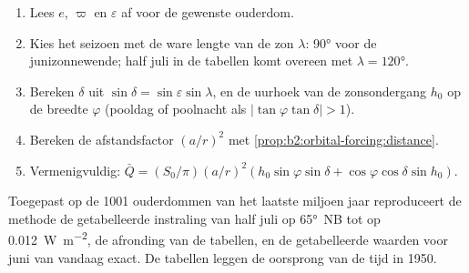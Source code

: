 \begin{method}\label{met:b2:orbital-forcing:curve}
\begin{enumerate}
  \item Lees $e$, $\varpi$ en $\varepsilon$ af voor de gewenste ouderdom.
  \item Kies het seizoen met de ware lengte van de zon $\lambda$: \ang{90} voor de junizonnewende;
        half juli in de tabellen komt overeen met $\lambda = \ang{120}$.
  \item Bereken $\delta$ uit $\sin\delta = \sin\varepsilon\sin\lambda$, en de uurhoek van de
        zonsondergang $h_0$ op de breedte $\varphi$ (pooldag of poolnacht als $|\tan\varphi\tan\delta| > 1$).
  \item Bereken de afstandsfactor $(a/r)^2$ met \cref{prop:b2:orbital-forcing:distance}.
  \item Vermenigvuldig: $\bar Q = (S_0/\pi)(a/r)^2(h_0\sin\varphi\sin\delta +
        \cos\varphi\cos\delta\sin h_0)$.
\end{enumerate}
\end{method}

Toegepast op de 1001 ouderdommen van het laatste miljoen jaar reproduceert de methode de getabelleerde instraling van half juli
op \ang{65}~NB tot op \qty{0.012}{W.m^{-2}}, de afronding van de tabellen, en de
getabelleerde waarden voor juni van vandaag exact. De tabellen leggen de oorsprong van de tijd in 1950.

